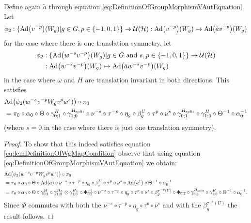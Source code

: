 \documentclass[11pt,a4paper,twoside]{article}
\numberwithin{equation}{section}
\begin{document}
	\begin{lemma}\label{lem:DefinitionOfWgMap}
		Define again $\tilde{a}$ through equation \eqref{eq:DefinitionOfGroupMorphismVAutEquation}. Let
		\begin{equation}
			\phi_2:\{\Ad{v^{-p}}(W_g)|g\in G,p\in\{-1,0,1\}\}\rightarrow \UU(\HH):\Ad{v^{-p}} (W_g)\mapsto \Ad{\tilde{a}v^{-p}} (W_g)
		\end{equation}
		for the case where there is one translation symmetry, let
		\begin{align}
			\phi_2&:\{\Ad{w^{-s}v^{-p}}(W_g)|g\in G\text{ and }s,p\in\{-1,0,1\}\}\rightarrow \UU(\HH)\\
			\nonumber
			&:\Ad{w^{-s}v^{-p}} (W_g)\mapsto \Ad{\tilde{a}w^{-s}v^{-p}} (W_g)
		\end{align}
		in the case where $\omega$ and $H$ are translation invariant in both directions. This satisfies
		\begin{align}\label{eq:lemDefinitionOfWgMapCondition}
			&\Ad{\phi_2(w^{-s}v^{-p}W_g v^{p}w^{s})}\circ\pi_0\\
			\nonumber
			&=\pi_0\circ \alpha_0\circ\Theta\circ\gamma^{H}_{0;1}\circ\gamma^{\Hsplit}_{1;0}\circ\nu^{-s}\circ\tau^{-p}\circ\eta_g\circ\beta_g^U\circ\tau^p\circ\nu^{s}\circ\gamma^{\Hsplit}_{0;1}\circ\gamma^{H}_{1;0}\circ\Theta^{-1}\circ\alpha_0^{-1}
		\end{align}
		(where $s=0$ in the case where there is just one translation symmetry).
	\end{lemma}
	\begin{proof}
		To show that this indeed satisfies equation \eqref{eq:lemDefinitionOfWgMapCondition} observe that using equation \eqref{eq:DefinitionOfGroupMorphismVAutEquation} we obtain:
		\begin{align}
			\nonumber
			&\Ad{\phi_2(w^{-s}v^{-p}W_g v^{p}w^{s})}\circ\pi_0\\
			&=\pi_0\circ \alpha_0\circ\Theta\circ\Ad{a}\circ\nu^{-s}\circ\tau^{-p}\circ\eta_g\circ\beta_g^U\circ\tau^p\circ\nu^{s}\circ\Ad{a^{\dagger}}\circ\Theta^{-1}\circ\alpha_0^{-1}\\
			\nonumber
			&=\pi_0\circ \alpha_0\circ\Theta\circ\gamma^H_{0;1}\circ\gamma^{H_L}_{1;0}\otimes\gamma^{H_L}_{1;0}\circ\stkout{\Phi_{0;1}^{-1}}\circ\nu^{-s}\circ\tau^{-p}\circ\eta_g\circ\tau^p\circ\nu^{s}\circ\beta_g^{\tau^{-p}(U)}\circ\stkout{\Phi_{0;1}}\circ\gamma^{\Hsplit}_{0;1}\circ\gamma^H_{1;0}\circ\Theta^{-1}\circ\alpha_0^{-1}.
		\end{align}
		Since $\Phi$ commutes with both the $\nu^{-s}\circ\tau^{-p}\circ\eta_g\circ\tau^p\circ\nu^s$ and with the $\beta_g^{\tau^{-p}(U)}$ the result follows.
	\end{proof}
\end{document}
